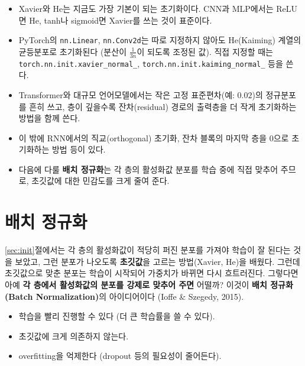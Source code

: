 \documentclass[11pt,a4paper]{article}
\begin{document}
\begin{remarkbox}
\begin{itemize}[leftmargin=1.5em]
\item Xavier와 He는 지금도 가장 기본이 되는 초기화이다.
CNN과 MLP에서는 ReLU면 He, tanh나 sigmoid면 Xavier를 쓰는 것이 표준이다.
\item PyTorch의 \texttt{nn.Linear}, \texttt{nn.Conv2d}는 따로 지정하지 않아도 He(Kaiming) 계열의 균등분포로 초기화된다
(분산이 $\frac{1}{3n}$이 되도록 조정된 값).
직접 지정할 때는 \texttt{torch.nn.init.xavier\_normal\_}, \texttt{torch.nn.init.kaiming\_normal\_} 등을 쓴다.
\item Transformer와 대규모 언어모델에서는 작은 고정 표준편차(예: $0.02$)의 정규분포를 흔히 쓰고,
층이 깊을수록 잔차(residual) 경로의 출력층을 더 작게 초기화하는 방법을 함께 쓴다.
\item 이 밖에 RNN에서의 직교(orthogonal) 초기화, 잔차 블록의 마지막 층을 $0$으로 초기화하는 방법 등이 있다.
\item 다음에 다룰 \textbf{배치 정규화}는 각 층의 활성화값 분포를 학습 중에 직접 맞추어 주므로,
초깃값에 대한 민감도를 크게 줄여 준다.
\end{itemize}
\end{remarkbox}

\section{배치 정규화}\label{sec:bn}

\ref{sec:init}절에서는 각 층의 활성화값이 적당히 퍼진 분포를 가져야 학습이 잘 된다는 것을 보았고,
그런 분포가 나오도록 \textbf{초깃값}을 고르는 방법(Xavier, He)을 배웠다.
그런데 초깃값으로 맞춘 분포는 학습이 시작되어 가중치가 바뀌면 다시 흐트러진다.
그렇다면 아예 \textbf{각 층에서 활성화값의 분포를 강제로 맞추어 주면} 어떨까?
이것이 \textbf{배치 정규화(Batch Normalization)}의 아이디어이다
(Ioffe \& Szegedy, 2015).

\begin{keybox}[배치 정규화의 장점]
\begin{itemize}[leftmargin=1.5em]
\item 학습을 빨리 진행할 수 있다 (더 큰 학습률을 쓸 수 있다).
\item 초깃값에 크게 의존하지 않는다.
\item overfitting을 억제한다 (dropout 등의 필요성이 줄어든다).
\end{itemize}
\end{keybox}
\end{document}
